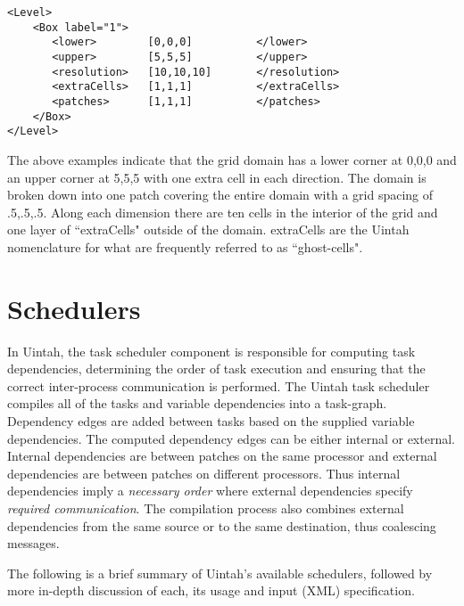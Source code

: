 \begin{Verbatim}[fontsize=\footnotesize]
<Level>
    <Box label="1">
       <lower>        [0,0,0]          </lower>
       <upper>        [5,5,5]          </upper>
       <resolution>   [10,10,10]       </resolution>
       <extraCells>   [1,1,1]          </extraCells>
       <patches>      [1,1,1]          </patches>
    </Box>
</Level>
\end{Verbatim}


The above examples indicate that the grid domain has a lower corner at
0,0,0 and an upper corner at 5,5,5 with one extra cell in each
direction.  The domain is broken down into one patch covering the
entire domain with a grid spacing of .5,.5,.5.  Along each dimension
there are ten cells in the interior of the grid and one layer of
``extraCells" outside of the domain.  extraCells are the Uintah nomenclature
for what are frequently referred to as ``ghost-cells".


\section{Schedulers} \label{Sec:Schedulers}

In Uintah, the task scheduler component is responsible for computing task
dependencies, determining the order of task execution and ensuring that the
correct inter-process communication is performed. The Uintah task scheduler
compiles all of the tasks and variable dependencies into a task-graph.
Dependency edges are added between tasks based on the supplied variable
dependencies. The computed dependency edges can be either internal or
external. Internal dependencies are between patches on the same processor and
external dependencies are between patches on different processors. Thus
internal dependencies imply a \emph{necessary order} where external
dependencies specify \emph{required communication}. The compilation process
also combines external dependencies from the same source or to the same
destination, thus coalescing messages.

\vspace{10pt}
\noindent The following is a brief summary of Uintah's available schedulers,
followed by more in-depth discussion of each, its usage and input (XML)
specification.

